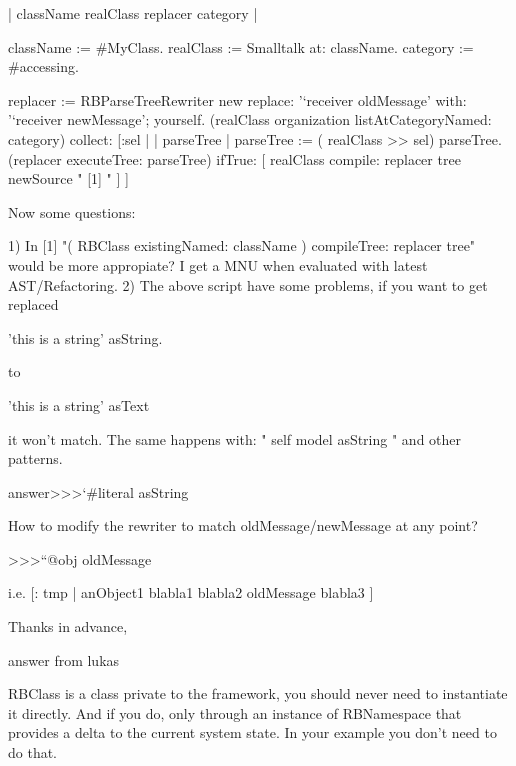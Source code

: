 \documentclass[a4paper,10pt,twoside]{book}
\begin{document}
\begin{code}{}
| className realClass replacer category |

className := #MyClass.
realClass := Smalltalk at: className.
category := #accessing.

replacer := RBParseTreeRewriter new
				replace: '`receiver oldMessage' with: '`receiver newMessage';
				yourself.
(realClass organization listAtCategoryNamed: category)
	collect: [:sel |
		| parseTree |
		parseTree := ( realClass >> sel) parseTree.
		(replacer executeTree: parseTree)
			ifTrue: [ realClass compile: replacer tree newSource " [1] " ] ]

Now some questions:

1) In [1] "( RBClass existingNamed: className ) compileTree: replacer
tree" would be more appropiate? I get a MNU when evaluated with latest
AST/Refactoring.
2) The above script have some problems, if you want to get replaced

'this is a string' asString.

to

'this is a string' asText

it won't match. The same happens with: " self model asString " and
other patterns. 

answer>>>`#literal asString


How to modify the rewriter to match
oldMessage/newMessage at any point?

>>>``@obj oldMessage


i.e. [: tmp | anObject1 blabla1 blabla2 oldMessage blabla3 ]

Thanks in advance,
\end{code}


answer from lukas
\begin{code}{}
RBClass is a class private to the framework, you should never need to
instantiate it directly. And if you do, only through an instance of
RBNamespace that provides a delta to the current system state. In your
example you don't need to do that.

\end{code}

\ifx\wholebook\relax\else
\end{document}

